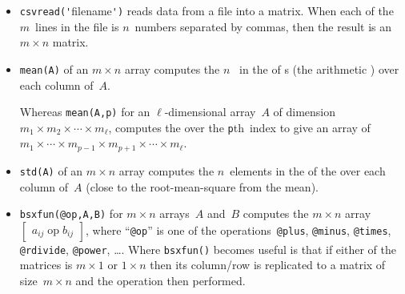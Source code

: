 \begin{table}
\begin{minipage}{\linewidth}
\begin{itemize}
\item  {}\verb|csvread('|filename\verb|')| reads data from a file into a matrix.
When each of the \(m\)~lines in the file is \(n\)~numbers separated by commas, then the result is an \(m\times n\) matrix. 

\item {}\verb|mean(A)| of an \(m\times n\) array computes the \(n\)~ in the  of s (the arithmetic ) over each column of~\(A\).

Whereas \verb|mean(A,p)| for an \(\ell\)-dimensional array~\(A\) of dimension \(m_1\times m_2\times\cdots\times m_\ell\),  computes the  over the \verb|p|th~index to give an array of  \(m_1\times\cdots\times m_{p-1}\times m_{p+1}\times\cdots\times m_\ell\).

\item {}\verb|std(A)| of an \(m\times n\) array computes the \(n\)~elements in the  of the  over each column of~\(A\) (close to the root-mean-square from the mean).

\item {}\verb|bsxfun(@op,A,B)| for \(m\times n\) arrays~\(A\) and~\(B\) computes the \(m\times n\) array \(\begin{bmatrix} a_{ij}\operatorname{op}b_{ij} \end{bmatrix}\), where ``\verb|@op|'' is one of the operations~\verb|@plus|, \verb|@minus|, \verb|@times|, \verb|@rdivide|, \verb|@power|, \ldots.
Where \verb|bsxfun()| becomes useful is that if either of the matrices is \(m\times1\) or \(1\times n\) then its column\slash row is replicated to a matrix of size~\(m\times n\) and the operation then performed. 





\end{itemize}
\end{minipage}
\end{table}
